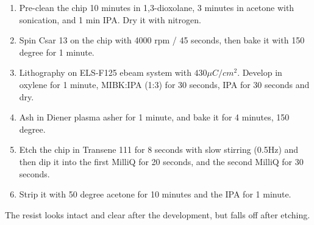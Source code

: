 \begin{enumerate}
    \item Pre-clean the chip 10 minutes in 1,3-dioxolane, 3 minutes in acetone with sonication, and 1 min IPA. Dry it with nitrogen.
    \item Spin Csar 13 on the chip with 4000 rpm / 45 seconds, then bake it with 150 degree for 1 minute.
    \item Lithography on ELS-F125 ebeam system with $430\mu C / cm^2$. Develop in oxylene for 1 minute, MIBK:IPA (1:3) for 30 seconds, IPA for 30 seconds and dry.
    \item Ash in Diener plasma asher for 1 minute, and bake it for 4 minutes, 150 degree.
    \item Etch the chip in Transene 111 for 8 seconds with slow stirring (0.5Hz) and then dip it into the first MilliQ for 20 seconds, and the second MilliQ for 30 seconds.
    \item Strip it with 50 degree acetone for 10 minutes and the IPA for 1 minute. 
\end{enumerate}

The resist looks intact and clear after the development, but falls off after etching.
\clearpage

